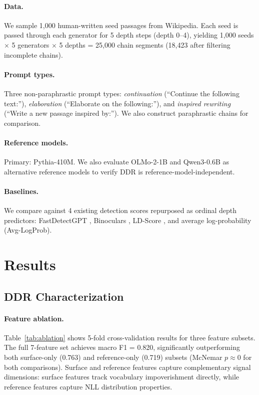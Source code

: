 \documentclass[11pt]{article}
\begin{document}
\paragraph{Data.}
We sample 1,000 human-written seed passages from Wikipedia. Each seed is passed through each generator for 5 depth steps (depth 0--4), yielding 1,000 seeds $\times$ 5 generators $\times$ 5 depths = 25,000 chain segments (18,423 after filtering incomplete chains).

\paragraph{Prompt types.}
Three non-paraphrastic prompt types: \emph{continuation} (``Continue the following text:''), \emph{elaboration} (``Elaborate on the following:''), and \emph{inspired rewriting} (``Write a new passage inspired by:''). We also construct paraphrastic chains for comparison.

\paragraph{Reference models.}
Primary: Pythia-410M. We also evaluate OLMo-2-1B and Qwen3-0.6B as alternative reference models to verify DDR is reference-model-independent.

\paragraph{Baselines.}
We compare against 4 existing detection scores repurposed as ordinal depth predictors: FastDetectGPT \cite{bao2024fastdetectgpt}, Binoculars \cite{hans2024binoculars}, LD-Score \cite{wu2025ldscore}, and average log-probability (Avg-LogProb).

\section{Results}
\label{sec:results}

\subsection{DDR Characterization}
\label{sec:ddr_results}

\paragraph{Feature ablation.}
Table~\ref{tab:ablation} shows 5-fold cross-validation results for three feature subsets. The full 7-feature set achieves macro F1 = 0.820, significantly outperforming both surface-only (0.763) and reference-only (0.719) subsets (McNemar $p \approx 0$ for both comparisons). Surface and reference features capture complementary signal dimensions: surface features track vocabulary impoverishment directly, while reference features capture NLL distribution properties.
\end{document}
